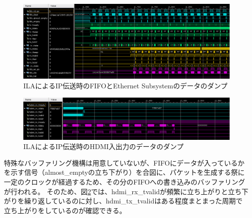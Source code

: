 \begin{figure}[htbp]
  \begin{center}
    \includegraphics[bb=0 0 1201 438,width=15.5cm]{img/fpga-ila-fifo-to-eth.png}
  \end{center}
  \caption{ILAによるIP伝送時のFIFOとEthernet Subsystemのデータのダンプ}
  \label{fig:fpga-ila-fifo-to-eth}
\end{figure}

\begin{figure}[htbp]
  \begin{center}
    \includegraphics[bb=0 0 1199 246,width=15.5cm]{img/fpga-ila-hdmi.png}
  \end{center}
  \caption{ILAによるIP伝送時のHDMI入出力のデータのダンプ}
  \label{fig:fpga-ila-hdmi}
\end{figure}


特殊なバッファリング機構は用意していないが、FIFOにデータが入っているかを示す信号（almost\_emptyの立ち下がり）を合図に、パケットを生成する祭に一定のクロックが経過するため、その分のFIFOへの書き込みのバッファリングが行われる。
そのため、図\ref{fig:fpga-ila-hdmi}では、hdmi\_rx\_tvalidが頻繁に立ち上がりと立ち下がりを繰り返しているのに対し、hdmi\_tx\_tvalidはある程度まとまった周期で立ち上がりをしているのが確認できる。
